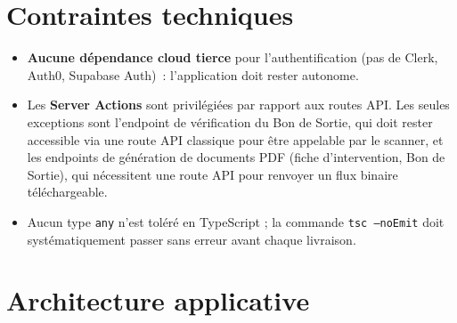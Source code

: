 \documentclass[11pt,a4paper]{report}
\begin{document}
\section{Contraintes techniques}

\begin{itemize}[leftmargin=1cm]
\item \textbf{Aucune dépendance cloud tierce} pour l'authentification (pas de Clerk,
      Auth0, Supabase Auth)~: l'application doit rester autonome.
\item Les \textbf{Server Actions} sont privilégiées par rapport aux routes API. Les seules
      exceptions sont l'endpoint de vérification du Bon de Sortie, qui doit rester
      accessible via une route API classique pour être appelable par le scanner, et les
      endpoints de génération de documents PDF (fiche d'intervention, Bon de Sortie), qui
      nécessitent une route API pour renvoyer un flux binaire téléchargeable.
\item Aucun type \texttt{any} n'est toléré en TypeScript ; la commande
      \texttt{tsc --noEmit} doit systématiquement passer sans erreur avant chaque
      livraison.
\end{itemize}

\section{Architecture applicative}
\end{document}
